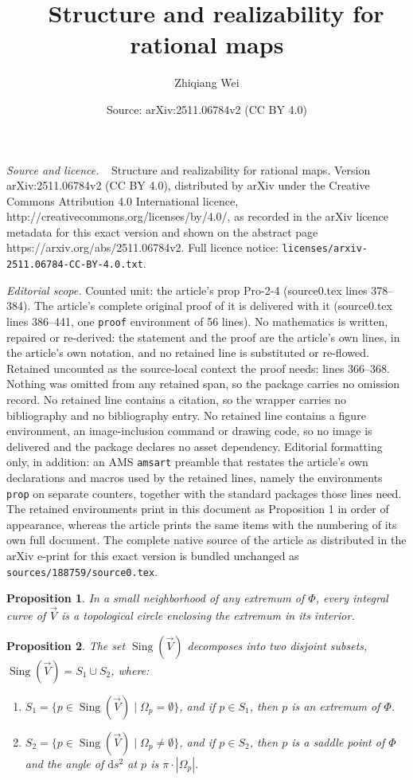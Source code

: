 \documentclass[10pt,a4paper]{amsart}
\title{$\ \ $ Structure and realizability for rational maps}
\author{Zhiqiang Wei}
\date{Source: arXiv:2511.06784v2 (CC BY 4.0)}
\newtheorem{prop}{Proposition}
\begin{document}
\maketitle

\noindent\emph{Source and licence.} $\ \ $ Structure and realizability for rational maps. Version arXiv:2511.06784v2 (CC BY 4.0), distributed by arXiv under the Creative Commons Attribution 4.0 International licence, http://creativecommons.org/licenses/by/4.0/, as recorded in the arXiv licence metadata for this exact version and shown on the abstract page https://arxiv.org/abs/2511.06784v2. Full licence notice: \texttt{licenses/arxiv-2511.06784-CC-BY-4.0.txt}.\par\smallskip

\noindent\textit{Editorial scope.} Counted unit: the article's prop Pro-2-4 (source0.tex lines 378--384). The article's complete original proof of it is delivered with it (source0.tex lines 386--441, one \texttt{proof} environment of 56 lines). No mathematics is written, repaired or re-derived: the statement and the proof are the article's own lines, in the article's own notation, and no retained line is substituted or re-flowed.  Retained uncounted as the source-local context the proof needs: lines 366--368.  Nothing was omitted from any retained span, so the package carries no omission record.  No retained line contains a citation, so the wrapper carries no bibliography and no bibliography entry.  No retained line contains a figure environment, an image-inclusion command or drawing code, so no image is delivered and the package declares no asset dependency.  Editorial formatting only, in addition: an AMS \texttt{amsart} preamble that restates the article's own declarations and macros used by the retained lines, namely the environments \texttt{prop} on separate counters, together with the standard packages those lines need.  The retained environments print in this document as Proposition 1 in order of appearance, whereas the article prints the same items with the numbering of its own full document.  The complete native source of the article as distributed in the arXiv e-print for this exact version is bundled unchanged as \texttt{sources/188759/source0.tex}.
\begin{prop}\label{Pro-2-3}
In a small neighborhood of any extremum of $\Phi$, every integral curve of $\vec{V}$ is a topological circle enclosing the extremum in its interior.
\end{prop}

\begin{prop}\label{Pro-2-4}
The set $\operatorname{Sing}(\vec{V})$ decomposes into two disjoint subsets, $\operatorname{Sing}(\vec{V}) = S_1 \cup S_2$, where:
\begin{enumerate}
\item $S_1 = \{ p \in \operatorname{Sing}(\vec{V}) \mid \Omega_p = \emptyset \}$, and if $p \in S_1$, then $p$ is an extremum of $\Phi$.
\item $S_2 = \{ p \in \operatorname{Sing}(\vec{V}) \mid \Omega_p \neq \emptyset \}$, and if $p \in S_2$, then $p$ is a saddle point of $\Phi$ and the angle of $\mathrm{d}s^2$ at $p$ is $\pi \cdot |\Omega_p|$.
\end{enumerate}
\end{prop}
\end{document}
